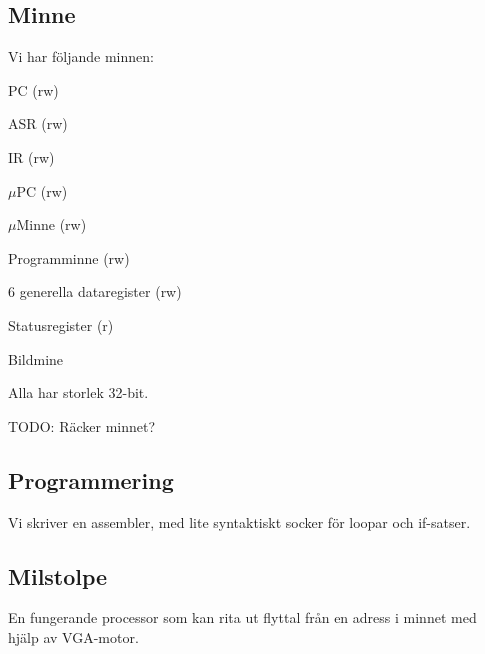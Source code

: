 \documentclass[]{article}
\begin{document}
\subsection{Minne}
Vi har följande minnen:
\begin{itemize*}
\item PC (rw)
\item ASR (rw)
\item IR (rw)
\item $\mu$PC (rw)
\item $\mu$Minne (rw)
\item Programminne (rw)
\item 6 generella dataregister (rw)
\item Statusregister (r)
\item Bildmine
\end{itemize*}
Alla har storlek 32-bit.

TODO: Räcker minnet?

\subsection{Programmering}
Vi skriver en assembler, med lite syntaktiskt socker för loopar och if-satser. 

\subsection{Milstolpe}
En fungerande processor som kan rita ut flyttal från en adress i minnet med hjälp av VGA-motor.
\end{document}
